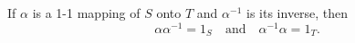 If $\alpha$ is a 1-1 mapping of $S$ onto $T$ and $\alpha^{-1}$ is its inverse, then
$$\alpha\alpha^{-1} = 1_S \quad \text{and} \quad \alpha^{-1}\alpha = 1_T.$$
